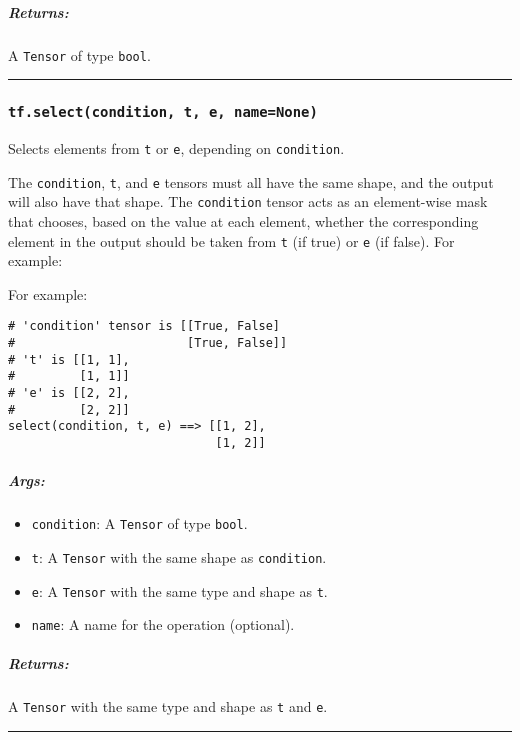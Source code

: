 \subparagraph{Returns: }\label{returns-13}

A \texttt{Tensor} of type \texttt{bool}.

\begin{center}\rule{0.5\linewidth}{\linethickness}\end{center}

\subsubsection{\texorpdfstring{\texttt{tf.select(condition,\ t,\ e,\ name=None)}
}{tf.select(condition, t, e, name=None) }}\label{tf.selectcondition-t-e-namenone}

Selects elements from \texttt{t} or \texttt{e}, depending on
\texttt{condition}.

The \texttt{condition}, \texttt{t}, and \texttt{e} tensors must all have
the same shape, and the output will also have that shape. The
\texttt{condition} tensor acts as an element-wise mask that chooses,
based on the value at each element, whether the corresponding element in
the output should be taken from \texttt{t} (if true) or \texttt{e} (if
false). For example:

For example:

\begin{verbatim}
# 'condition' tensor is [[True, False]
#                        [True, False]]
# 't' is [[1, 1],
#         [1, 1]]
# 'e' is [[2, 2],
#         [2, 2]]
select(condition, t, e) ==> [[1, 2],
                             [1, 2]]
\end{verbatim}

\subparagraph{Args: }\label{args-14}

\begin{itemize}
\tightlist
\item
  \texttt{condition}: A \texttt{Tensor} of type \texttt{bool}.
\item
  \texttt{t}: A \texttt{Tensor} with the same shape as
  \texttt{condition}.
\item
  \texttt{e}: A \texttt{Tensor} with the same type and shape as
  \texttt{t}.
\item
  \texttt{name}: A name for the operation (optional).
\end{itemize}

\subparagraph{Returns: }\label{returns-14}

A \texttt{Tensor} with the same type and shape as \texttt{t} and
\texttt{e}.

\begin{center}\rule{0.5\linewidth}{\linethickness}\end{center}

